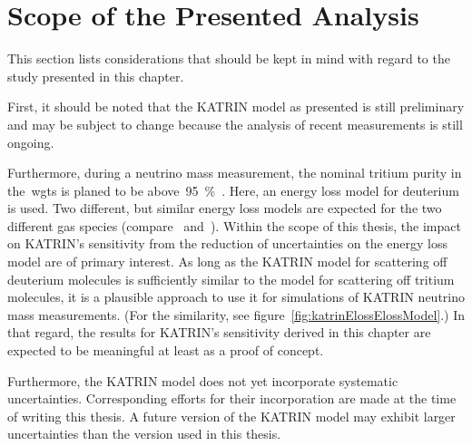 \section{Scope of the Presented Analysis}
\label{sec:katrinElossValidity}
This section lists considerations that should be kept in mind with regard to the study presented in this chapter.

First, it should be noted that the KATRIN model as presented is still preliminary and may be subject to change because the analysis of recent measurements is still ongoing.

Furthermore, during a neutrino mass measurement, the nominal tritium purity in the~\gls{wgts} is planed to be above~\SI{95}{\percent}~\cite{Angrik:2005ep}. Here, an energy loss model for deuterium is used. Two different, but similar energy loss models are expected for the two different gas species (compare~\cite{Abdurashitov2017} and~\cite{Aseev2000}). Within the scope of this thesis, the impact on KATRIN's sensitivity from the reduction of uncertainties on the energy loss model are of primary interest. As long as the KATRIN model for scattering off deuterium molecules is sufficiently similar to the model for scattering off tritium molecules, it is a plausible approach to use it for simulations of KATRIN neutrino mass measurements. (For the similarity, see figure~\ref{fig:katrinElossElossModel}.) In that regard, the results for KATRIN's sensitivity derived in this chapter are expected to be meaningful at least as a proof of concept.

Furthermore, the KATRIN model does not yet incorporate systematic uncertainties. Corresponding efforts for their incorporation are made at the time of writing this thesis. A future version of the KATRIN model may exhibit larger uncertainties than the version used in this thesis.
\FloatBarrier


\def\currentRootFolder{chapter/sensitivityStudyWithPreliminaryKatrinElossModel}
\def\currentFigureFolder{\currentRootFolder/fig}
\FloatBarrier
